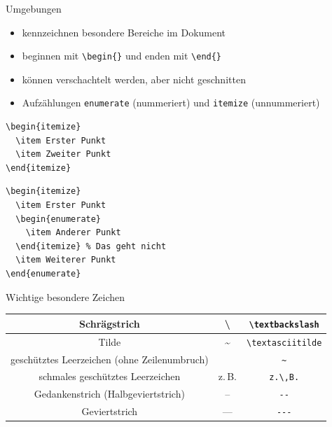 \documentclass[presentation,aspectratio=169]{beamer}
\begin{document}
\begin{frame}[fragile]{Umgebungen}
  \begin{itemize}
    \item kennzeichnen besondere Bereiche im Dokument
    \item beginnen mit \verb|\begin{}| und enden mit \verb|\end{}|
    \item können verschachtelt werden, aber nicht geschnitten
    \item Aufzählungen \verb|enumerate| (nummeriert) und \verb|itemize| (unnummeriert)
  \end{itemize}
  \begin{minipage}{.4\textwidth}
    \centering
    \begin{verbatim}
\begin{itemize}
  \item Erster Punkt
  \item Zweiter Punkt
\end{itemize}
    \end{verbatim}
  \end{minipage}
  \begin{minipage}{.4\textwidth}
    \centering
    \begin{verbatim}
\begin{itemize}
  \item Erster Punkt
  \begin{enumerate}
    \item Anderer Punkt
  \end{itemize} % Das geht nicht
  \item Weiterer Punkt
\end{enumerate}
    \end{verbatim}
  \end{minipage}
\end{frame}

\begin{frame}[fragile]{Wichtige besondere Zeichen}
  \begin{tabular}{c|c|c}
    Schrägstrich                                  & \textbackslash   & \verb|\textbackslash| \\
    \hline
    Tilde                                         & \textasciitilde  & \verb|\textasciitilde| \\
    \hline
    geschütztes Leerzeichen (ohne Zeilenumbruch)  & ~                & \verb|~| \\
    \hline
    schmales geschütztes Leerzeichen              & z.\,B.           & \verb|z.\,B.| \\
    \hline
    Gedankenstrich (Halbgeviertstrich)            & --               & \verb|--| \\
    \hline
    Geviertstrich                                 & ---              & \verb|---|
  \end{tabular}
\end{frame}
\end{document}
